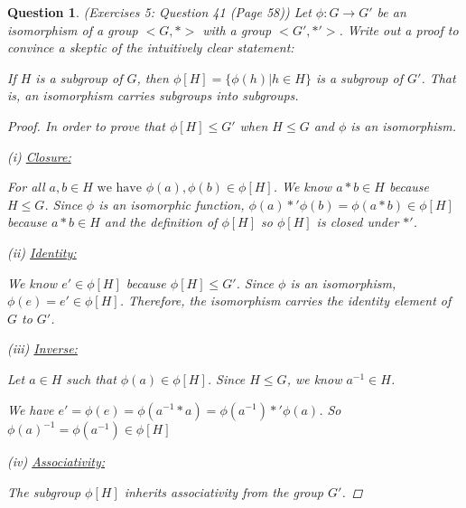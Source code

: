 \documentclass{article}
\newtheorem{ques}{Question}
\begin{document}
\begin{ques} (Exercises 5: Question 41 (Page 58))
	Let $\phi : G \rightarrow G'$ be an isomorphism of a group 	$<G, *>$ with a group $ <G', *'>$. Write out a proof to convince a skeptic of the intuitively clear statement:
	
	If $H$ is a subgroup of $G$, then $\phi[H] = \{\phi(h) | h \in H\}$ is a subgroup of $G'$. That is, an isomorphism carries subgroups into subgroups.

	\begin{proof}
		
		In order to prove that $\phi[H] \leq G'$ when $H \leq G $ and $\phi$ is an isomorphism.
		
		(i) \underline{Closure:}
		
		For all $a,b \in H \text{ we have } \phi(a), \phi(b) \in \phi[H]$. We know $a * b \in H$ because $H \leq G$. Since $\phi$ is an isomorphic function, $\phi(a) *' \phi(b) = \phi(a * b) \in \phi[H]$ because $a*b \in H$ and the definition of $\phi[H]$ so $\phi[H]$ is closed under $*'$.
		
		(ii) \underline{Identity:}
		
		We know $e' \in \phi[H]$ because $\phi[H] \leq G'$. Since $\phi$ is an isomorphism, $\phi(e) = e' \in \phi[H]$. Therefore, the isomorphism carries the identity element of $G$ to $G'$.
		
		(iii) \underline{Inverse:}
		
		Let $a \in H$ such that $\phi(a) \in \phi[H]$. Since $H \leq G$, we know $a^{-1} \in H$.
		
		We have $e' = \phi(e) = \phi(a^{-1} *a) = \phi(a^{-1} )*' \phi(a)$. So $\phi(a)^{-1} = \phi(a^{-1}) \in \phi[H]$
		
		(iv) \underline{Associativity: }
		
		The subgroup $\phi[H]$ inherits associativity from the group $G'$.
		
		
	\end{proof}
\end{ques}
\end{document}
